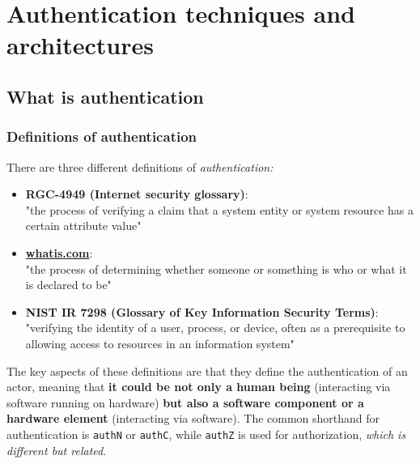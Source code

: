 \chapter{Authentication techniques and architectures}

\section{What is authentication}


\subsection{Definitions of authentication}
There are three different definitions of \emph{authentication:}
\begin{itemize}
  \item \textbf{RGC-4949 (Internet security glossary)}:\\
        "the process of verifying a claim that a system entity or system
        resource has a certain attribute value"
  \item \textbf{\url{whatis.com}}:\\
        "the process of determining whether someone or something is
        who or what it is declared to be"
  \item \textbf{NIST IR 7298 (Glossary of Key Information Security Terms)}:\\
        "verifying the identity of a user, process, or device, often as a
        prerequisite to allowing access to resources in an information
        system"
\end{itemize}
The key aspects of these definitions  are that they define the authentication of an actor, meaning that \textbf{it could be not only a human being} (interacting via software running on hardware) \textbf{but also a software component or a hardware element} (interacting via software). The common shorthand for authentication is \texttt{authN} or \texttt{authC}, while \texttt{authZ} is used for authorization, \textit{which is different but related}.


